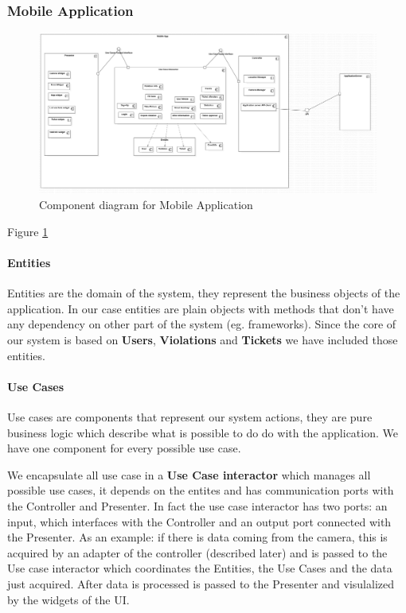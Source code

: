 \subsubsection{Mobile Application}
\begin{figure}
\centering
\includegraphics[width=\textwidth]{Images/ComponentDiagram1.png}
\caption{\label{fig:compdiag1} Component diagram for Mobile Application}
\end{figure}

Figure \ref{fig:compdiag1}

\paragraph{Entities}
Entities are the domain of the system, they represent the business objects of the application. In our case entities are plain objects with methods that don't have any dependency on other part of the system (eg. frameworks).
Since the core of our system is based on \textbf{Users}, \textbf{Violations} and \textbf{Tickets} we have included those entities.

\paragraph{Use Cases}
Use cases are components that represent our system actions, they are pure business logic which describe what is possible to do do with the application. We have one component for every possible use case.

We encapsulate all use case in a \textbf{Use Case interactor} which manages all possible use cases, it depends on the entites and has communication ports with the Controller and Presenter.
In fact the use case interactor has two ports: an input, which interfaces with the Controller and an output port connected with the Presenter. As an example: if there is data coming from the camera, this is acquired by an adapter of the controller (described later) and is passed to the Use case interactor which coordinates the Entities, the Use Cases and the data just acquired. After data is processed is passed to the Presenter and visulalized by the widgets of the UI.


